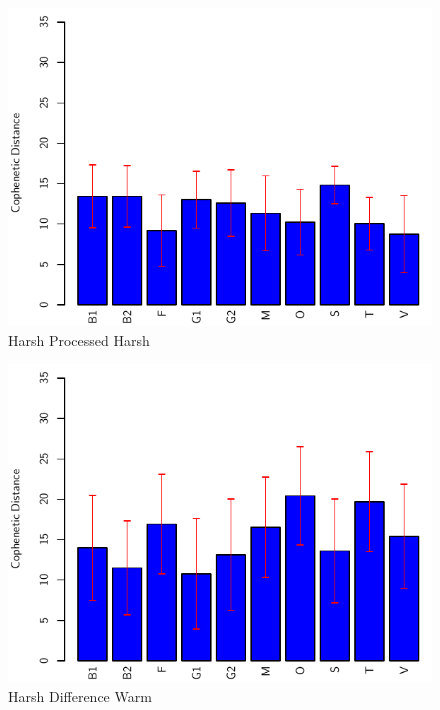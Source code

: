 		\begin{figure}[h!]
			\centering
			\includegraphics{chapter7/Images/HarshProcessedHarshBar.pdf}
			\caption{Harsh Processed Harsh}
		\end{figure}

		\begin{figure}[h!]
			\centering
			\includegraphics{chapter7/Images/HarshDifferenceWarmBar.pdf}
			\caption{Harsh Difference Warm}
		\end{figure}

